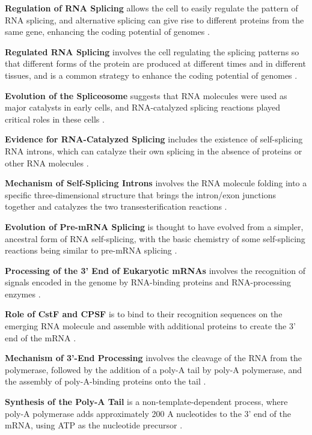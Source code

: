 \textbf{Regulation of RNA Splicing} allows the cell to easily regulate the pattern of RNA splicing, and alternative splicing can give rise to different proteins from the same gene, enhancing the coding potential of genomes \cite*{L1-Chapter6}.

\textbf{Regulated RNA Splicing} involves the cell regulating the splicing patterns so that different forms of the protein are produced at different times and in different tissues, and is a common strategy to enhance the coding potential of genomes \cite*{L1-Chapter6}.

\textbf{Evolution of the Spliceosome} suggests that RNA molecules were used as major catalysts in early cells, and RNA-catalyzed splicing reactions played critical roles in these cells \cite*{L1-Chapter6}.

\textbf{Evidence for RNA-Catalyzed Splicing} includes the existence of self-splicing RNA introns, which can catalyze their own splicing in the absence of proteins or other RNA molecules \cite*{L1-Chapter6}.

\textbf{Mechanism of Self-Splicing Introns} involves the RNA molecule folding into a specific three-dimensional structure that brings the intron/exon junctions together and catalyzes the two transesterification reactions \cite*{L1-Chapter6}.

\textbf{Evolution of Pre-mRNA Splicing} is thought to have evolved from a simpler, ancestral form of RNA self-splicing, with the basic chemistry of some self-splicing reactions being similar to pre-mRNA splicing \cite*{L1-Chapter6}.

\textbf{Processing of the 3' End of Eukaryotic mRNAs} involves the recognition of signals encoded in the genome by RNA-binding proteins and RNA-processing enzymes \cite*{L1-Chapter6}.

\textbf{Role of CstF and CPSF} is to bind to their recognition sequences on the emerging RNA molecule and assemble with additional proteins to create the 3' end of the mRNA \cite*{L1-Chapter6}.

\textbf{Mechanism of 3'-End Processing} involves the cleavage of the RNA from the polymerase, followed by the addition of a poly-A tail by poly-A polymerase, and the assembly of poly-A-binding proteins onto the tail \cite*{L1-Chapter6}.

\textbf{Synthesis of the Poly-A Tail} is a non-template-dependent process, where poly-A polymerase adds approximately 200 A nucleotides to the 3' end of the mRNA, using ATP as the nucleotide precursor \cite*{L1-Chapter6}.

